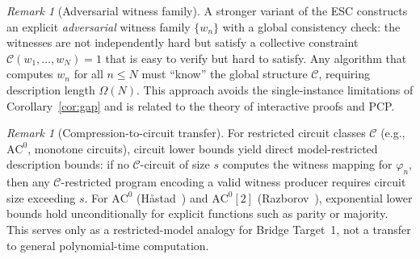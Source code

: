 \documentclass[aps,prd,twocolumn,superscriptaddress,nofootinbib]{revtex4-2}
\theoremstyle{definition}
\theoremstyle{remark}
\newtheorem{remark}[theorem]{Remark}
\begin{document}
\begin{remark}[Adversarial witness family]
\label{rem:adversarial-witness}
A stronger variant of the ESC constructs an explicit \emph{adversarial} witness family $\{w_n\}$ with a global consistency check: the witnesses are not independently hard but satisfy a collective constraint $\mathcal{C}(w_1, \ldots, w_N) = 1$ that is easy to verify but hard to satisfy. Any algorithm that computes $w_n$ for all $n \leq N$ must ``know'' the global structure $\mathcal{C}$, requiring description length $\Omega(N)$. This approach avoids the single-instance limitations of Corollary~\ref{cor:gap} and is related to the theory of interactive proofs and PCP.
\end{remark}

\begin{remark}[Compression-to-circuit transfer]
\label{rem:compression-circuit}
For restricted circuit classes $\mathcal{C}$ (e.g., $\mathrm{AC}^0$, monotone circuits), circuit lower bounds yield direct model-restricted description bounds: if no $\mathcal{C}$-circuit of size $s$ computes the witness mapping for $\varphi_n$, then any $\mathcal{C}$-restricted program encoding a valid witness producer requires circuit size exceeding $s$. For $\mathrm{AC}^0$ (H\r{a}stad~\cite{Hastad1987}) and $\mathrm{AC}^0[2]$ (Razborov~\cite{Razborov1987}), exponential lower bounds hold unconditionally for explicit functions such as parity or majority. This serves only as a restricted-model analogy for Bridge Target~1, not a transfer to general polynomial-time computation.
\end{remark}
\end{document}
